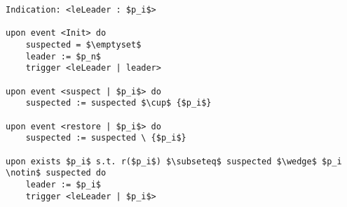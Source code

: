 \begin{lstlisting}[caption = eventually leader election, mathescape, captionpos=b]
Indication: <leLeader : $p_i$>

upon event <Init> do
    suspected = $\emptyset$
    leader := $p_n$
    trigger <leLeader | leader>

upon event <suspect | $p_i$> do
    suspected := suspected $\cup$ {$p_i$}

upon event <restore | $p_i$> do
    suspected := suspected \ {$p_i$}

upon exists $p_i$ s.t. r($p_i$) $\subseteq$ suspected $\wedge$ $p_i \notin$ suspected do
    leader := $p_i$
    trigger <leLeader | $p_i$>
\end{lstlisting}
